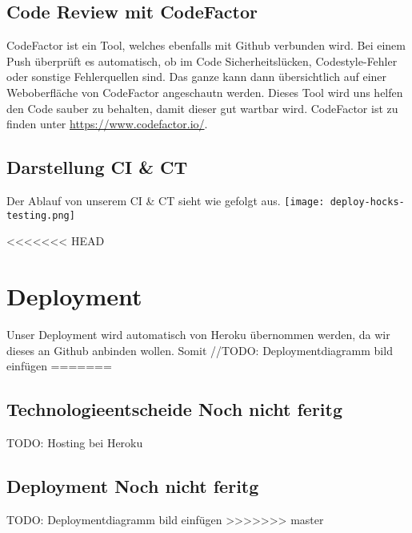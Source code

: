 	\subsection{Code Review mit CodeFactor}
	CodeFactor ist ein Tool, welches ebenfalls mit Github verbunden wird. Bei einem Push überprüft es automatisch, ob im Code Sicherheitslücken, Codestyle-Fehler oder sonstige Fehlerquellen sind. Das ganze kann dann übersichtlich auf einer Weboberfläche von CodeFactor angeschautn werden. Dieses Tool wird uns helfen den Code sauber zu behalten, damit dieser gut wartbar wird. CodeFactor ist zu finden unter \href{https://www.codefactor.io/}{https://www.codefactor.io/}.

	\subsection{Darstellung CI \& CT}
	Der Ablauf von unserem CI \& CT sieht wie gefolgt aus.\newline
	\noindent
	\texttt{[image: deploy-hocks-testing.png]}

<<<<<<< HEAD
	\section{Deployment}
	Unser Deployment wird automatisch von Heroku übernommen werden, da wir dieses an Github anbinden wollen. Somit 
	//TODO: Deploymentdiagramm bild einfügen
=======
  \subsection{Technologieentscheide Noch nicht feritg}
		TODO: Hosting bei Heroku

	\subsection{Deployment Noch nicht feritg}
		TODO: Deploymentdiagramm bild einfügen
>>>>>>> master

